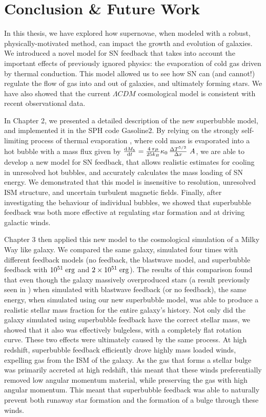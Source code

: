 \documentclass[letterpaper,12pt,twoside,openright]{report} %
\begin{document}
\chapter{Conclusion \& Future Work}
\thispagestyle{fancy}
In this thesis, we have explored how supernovae, when modeled with a robust,
physically-motivated method, can impact the growth and evolution of galaxies.
We introduced a novel model for SN feedback that takes into account the
important effects of previously ignored physics: the evaporation of cold gas
driven by thermal conduction.  This model allowed us to see how SN can (and
cannot!) regulate the flow of gas into and out of galaxies, and ultimately
forming stars.  We have also showed that the current $\Lambda CDM$ cosmological
model is consistent with recent observational data.

In Chapter 2, we presented a detailed description of the new superbubble model,
and implemented it in the SPH code {\sc Gasoline2}.  By relying on the strongly
self-limiting process of thermal evaporation \citep{Cowie1977}, where cold mass is evaporated into
a hot bubble with a mass flux given by $ \frac{{\rm d }M_b}{{\rm d}t} =
\frac{4\,\pi\mu}{25k_B}\kappa_0\,\frac{\Delta T^{5/2}}{\Delta x}\ A$, we are
able to develop a new model for SN feedback, that allows realistic estimates for
cooling in unresolved hot bubbles, and accurately calculates the mass loading of
SN energy.  We demonstrated that this model is insensitive to resolution,
unresolved ISM structure, and uncertain turbulent magnetic fields.  Finally,
after investigating the behaviour of individual bubbles, we showed that
superbubble feedback was both more effective at regulating star formation and at
driving galactic winds.

Chapter 3 then applied this new model to the cosmological simulation of a Milky
Way like galaxy.  We compared the same galaxy, simulated four times with
different feedback models (no feedback, the \citet{Stinson2006} blastwave model,
and superbubble feedback with $10^{51}\;\rm{erg}$ and
$2\times10^{51}\;\rm{erg}$).  The results of this comparison found that even
though the galaxy massively overproduced stars (a result previously seen in
\citealt{Stinson2010}) when simulated with blastwave feedback (or no feedback),
the same energy, when simulated using our new superbubble model, was able to
produce a realistic stellar mass fraction for the entire galaxy's history.  Not
only did the galaxy simulated using superbubble feedback have the correct
stellar mass, we showed that it also was effectively bulgeless, with a
completely flat rotation curve.  These two effects were ultimately caused by the
same process.  At high redshift, superbubble feedback efficiently drove highly
mass loaded winds, expelling gas from the ISM of the galaxy.  As the gas that
forms a stellar bulge was primarily accreted at high redshift, this meant that
these winds preferentially removed low angular momentum material, while
preserving the gas with high angular momentum.  This meant that superbubble
feedback was able to naturally prevent both runaway star formation and the
formation of a bulge through these winds.
\end{document}

